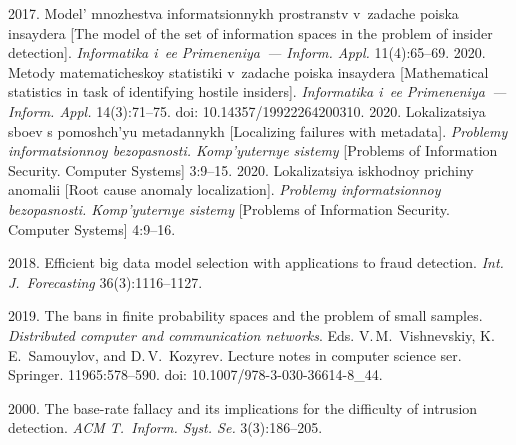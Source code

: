 \begin{multicols}{2}
{{\begin{thebibliography}{99}
 2017. Model' 
mnozhestva informatsionnykh prostranstv v~zadache poiska insaydera [The model of the set of 
information spaces in the problem of insider detection]. \textit{Informatika i~ee Primeneniya~--- 
Inform. Appl.} 11(4):65--69.
2020. Metody ma\-te\-ma\-ti\-che\-skoy statistiki v~zadache poiska insaydera [Mathematical statistics in task 
of identifying hostile insiders]. \textit{Informatika i~ee Primeneniya~--- Inform. Appl.} 14(3):71--75. 
doi: 10.14357/19922264200310.
 2020. Lokalizatsiya sboev s pomoshch'yu 
metadannykh [Localizing failures with metadata]. \textit{Problemy informatsionnoy bezopasnosti. 
Komp'yuternye sistemy} [Problems of Information Security. Computer Systems] 3:9--15.
 2020. Lokalizatsiya 
iskhodnoy prichiny anomalii [Root cause anomaly localization]. \textit{Problemy informatsionnoy 
bezopasnosti. Komp'yuternye sistemy} [Problems of Information Security. Computer Systems] 4:9--16.
{

}

 2018. Efficient big data model selection with applications to fraud detection. 
\textit{Int. J.~Forecasting} 36(3):1116--1127.


 2019. The bans in finite probability spaces and the 
problem of small samples. \textit{Distributed computer and communication networks}. Eds. 
V.\,M.~Vishnevskiy, K.\,E.~Samouylov, and D.\,V.~Kozyrev. Lecture notes in computer science ser. 
Springer. 11965:578--590. doi: 10.1007/978-3-030-36614-8\_44. 

 2000. The base-rate fallacy and its implications for the difficulty of intrusion 
detection. \textit{ACM T.~Inform. Syst. Se.} 3(3):186--205.


\end{thebibliography}}}
\end{multicols}
